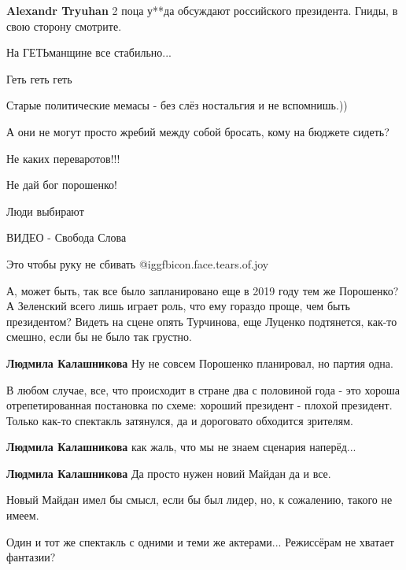 \begin{itemize}
\begin{itemize}
\textbf{Alexandr Tryuhan} 2 поца у**да обсуждают российского президента. Гниды, в свою сторону смотрите.

\end{itemize} %

На ГЕТЬманщине все стабильно...

Геть геть геть

Старые политические мемасы - без слёз ностальгия и не вспомнишь.))

А они не могут просто жребий между собой бросать, кому на бюджете сидеть?

Не каких переваротов!!!

Не дай бог порошенко!

Люди выбирают

ВИДЕО - Свобода Слова

Это чтобы руку не сбивать @igg{fbicon.face.tears.of.joy} 


А, может быть, так все было запланировано еще в 2019 году тем же Порошенко? А
Зеленский всего лишь играет роль, что ему гораздо проще, чем быть президентом?
Видеть на сцене опять Турчинова, еще Луценко подтянется, как-то смешно, если бы
не было так грустно.

\begin{itemize} %
\textbf{Людмила Калашникова} Ну не совсем Порошенко планировал, но партия одна.


В любом случае, все, что происходит в стране два с половиной года - это хороша
отрепетированная постановка по схеме: хороший президент - плохой президент.
Только как-то спектакль затянулся, да и дороговато обходится зрителям.


\textbf{Людмила Калашникова} как жаль, что мы не знаем сценария наперёд...

\textbf{Людмила Калашникова} Да просто нужен новий Майдан да и все.

Новый Майдан имел бы смысл, если бы был лидер, но, к сожалению, такого не имеем.
\end{itemize} %


Один и тот же спектакль с одними и теми же актерами... Режиссёрам не хватает
фантазии?


\end{itemize}
